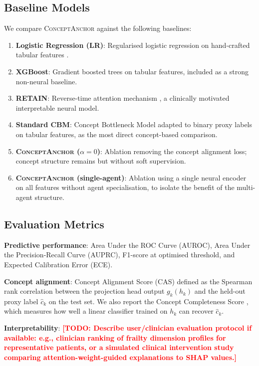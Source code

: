 \documentclass[review,12pt,authoryear]{elsarticle}
\newcommand{\todo}[1]{\textcolor{red}{\textbf{[TODO: #1]}}}
\newcommand{\modelname}{\textsc{ConceptAnchor}}
\begin{document}
\subsection{Baseline Models}

We compare \modelname{} against the following baselines:

\begin{enumerate}[leftmargin=*, label=\arabic*., noitemsep]
  \item \textbf{Logistic Regression (LR)}: Regularised logistic regression on hand-crafted tabular features \citep{hauskrecht2013outlier}.
  \item \textbf{XGBoost}: Gradient boosted trees \citep{chen2016xgboost} on tabular features, included as a strong non-neural baseline.
  \item \textbf{RETAIN}: Reverse-time attention mechanism \citep{choi2016retain}, a clinically motivated interpretable neural model.
  \item \textbf{Standard CBM}: Concept Bottleneck Model \citep{koh2020concept} adapted to binary proxy labels on tabular features, as the most direct concept-based comparison.
  \item \textbf{\modelname{} ($\alpha = 0$)}: Ablation removing the concept alignment loss; concept structure remains but without soft supervision.
  \item \textbf{\modelname{} (single-agent)}: Ablation using a single neural encoder on all features without agent specialisation, to isolate the benefit of the multi-agent structure.
\end{enumerate}

\subsection{Evaluation Metrics}

\textbf{Predictive performance}: Area Under the ROC Curve (AUROC), Area Under the Precision-Recall Curve (AUPRC), F1-score at optimised threshold, and Expected Calibration Error (ECE).

\textbf{Concept alignment}: Concept Alignment Score (CAS) defined as the Spearman rank correlation between the projection head output $g_k(h_k)$ and the held-out proxy label $\hat{c}_k$ on the test set.
We also report the Concept Completeness Score \citep{yeh2020completeness}, which measures how well a linear classifier trained on $h_k$ can recover $\hat{c}_k$.

\textbf{Interpretability}: \todo{Describe user/clinician evaluation protocol if available: e.g., clinician ranking of frailty dimension profiles for representative patients, or a simulated clinical intervention study comparing attention-weight-guided explanations to SHAP values.}
\end{document}
